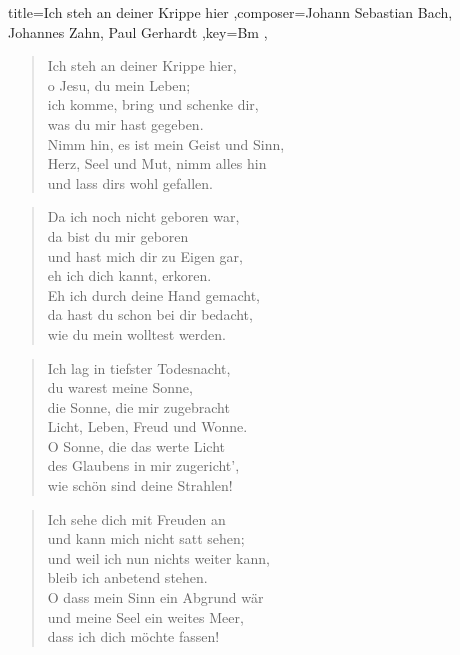 \documentclass[]{leadsheet}
\begin{document}
\begin{song}{title={Ich steh an deiner Krippe hier
},composer={Johann Sebastian Bach, Johannes Zahn, Paul Gerhardt
},key={Bm
},}
\begin{verse}
Ich steh an deiner Krippe hier, \\
o Jesu, du mein Leben; \\
ich komme, bring und schenke dir, \\
was du mir hast gegeben. \\
Nimm hin, es ist mein Geist und Sinn, \\
Herz, Seel und Mut, nimm alles hin \\
und lass dirs wohl gefallen. \\
\end{verse}

\begin{verse}
Da ich noch nicht geboren war, \\
da bist du mir geboren \\
und hast mich dir zu Eigen gar, \\
eh ich dich kannt, erkoren. \\
Eh ich durch deine Hand gemacht, \\
da hast du schon bei dir bedacht, \\
wie du mein wolltest werden. \\
\end{verse}

\begin{verse}
Ich lag in tiefster Todesnacht, \\
du warest meine Sonne, \\
die Sonne, die mir zugebracht \\
Licht, Leben, Freud und Wonne. \\
O Sonne, die das werte Licht \\
des Glaubens in mir zugericht', \\
wie schön sind deine Strahlen! \\
\end{verse}

\begin{verse}
Ich sehe dich mit Freuden an \\
und kann mich nicht satt sehen; \\
und weil ich nun nichts weiter kann, \\
bleib ich anbetend stehen. \\
O dass mein Sinn ein Abgrund wär \\
und meine Seel ein weites Meer, \\
dass ich dich möchte fassen! \\
\end{verse}


\end{song}
\end{document}
